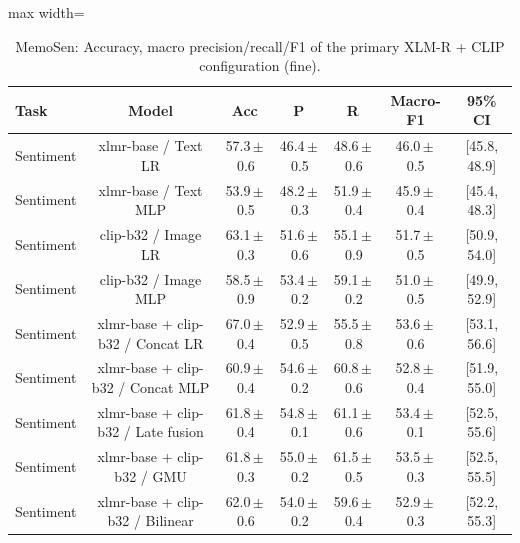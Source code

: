 \begin{table}[t]
\centering
\small
\caption{MemoSen: Accuracy, macro precision/recall/F1 of the primary XLM-R + CLIP configuration (fine).}
\label{tab:primary_fine_memosen}
\begin{adjustbox}{max width=\textwidth}
\begin{tabular}{lcccccc}
\toprule
Task & Model & Acc & P & R & Macro-F1 & 95\% CI \\
\midrule
Sentiment & xlmr-base / Text LR & 57.3\,$\pm$\,0.6 & 46.4\,$\pm$\,0.5 & 48.6\,$\pm$\,0.6 & 46.0\,$\pm$\,0.5 & [45.8, 48.9] \\
Sentiment & xlmr-base / Text MLP & 53.9\,$\pm$\,0.5 & 48.2\,$\pm$\,0.3 & 51.9\,$\pm$\,0.4 & 45.9\,$\pm$\,0.4 & [45.4, 48.3] \\
Sentiment & clip-b32 / Image LR & 63.1\,$\pm$\,0.3 & 51.6\,$\pm$\,0.6 & 55.1\,$\pm$\,0.9 & 51.7\,$\pm$\,0.5 & [50.9, 54.0] \\
Sentiment & clip-b32 / Image MLP & 58.5\,$\pm$\,0.9 & 53.4\,$\pm$\,0.2 & 59.1\,$\pm$\,0.2 & 51.0\,$\pm$\,0.5 & [49.9, 52.9] \\
Sentiment & xlmr-base + clip-b32 / Concat LR & 67.0\,$\pm$\,0.4 & 52.9\,$\pm$\,0.5 & 55.5\,$\pm$\,0.8 & 53.6\,$\pm$\,0.6 & [53.1, 56.6] \\
Sentiment & xlmr-base + clip-b32 / Concat MLP & 60.9\,$\pm$\,0.4 & 54.6\,$\pm$\,0.2 & 60.8\,$\pm$\,0.6 & 52.8\,$\pm$\,0.4 & [51.9, 55.0] \\
Sentiment & xlmr-base + clip-b32 / Late fusion & 61.8\,$\pm$\,0.4 & 54.8\,$\pm$\,0.1 & 61.1\,$\pm$\,0.6 & 53.4\,$\pm$\,0.1 & [52.5, 55.6] \\
Sentiment & xlmr-base + clip-b32 / GMU & 61.8\,$\pm$\,0.3 & 55.0\,$\pm$\,0.2 & 61.5\,$\pm$\,0.5 & 53.5\,$\pm$\,0.3 & [52.5, 55.5] \\
Sentiment & xlmr-base + clip-b32 / Bilinear & 62.0\,$\pm$\,0.6 & 54.0\,$\pm$\,0.2 & 59.6\,$\pm$\,0.4 & 52.9\,$\pm$\,0.3 & [52.2, 55.3] \\
\bottomrule
\end{tabular}
\end{adjustbox}
\end{table}
